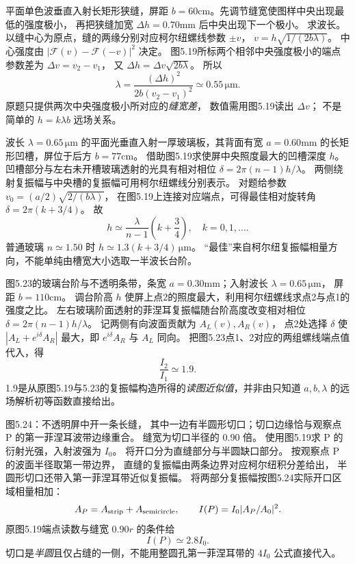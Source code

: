 平面单色波垂直入射长矩形狭缝，屏距
$b=60$cm。先调节缝宽使图样中央出现最低的强度极小，
再把狭缝加宽
$\Delta h=0.70$mm 后中央出现下一个极小。
求波长。
\exsolution
以缝中心为原点，缝的两缘分别对应柯尔纽螺线参数
$\pm v$，
$v=h\sqrt{1/(2b\lambda)}$。
中心强度由
$|\mathcal F(v)-\mathcal F(-v)|^2$ 决定。
图5.19所标两个相邻中央强度极小的端点参数差为
$\Delta v=v_2-v_1$，
又
$\Delta h=\Delta v\sqrt{2b\lambda}$。
所以
\[
\boxed{\lambda=
\frac{(\Delta h)^2}
{2b(v_2-v_1)^2}
\simeq0.55\,\mathrm{\mu m}}.
\]
\excheck 原题只提供两次中央强度极小所对应的\emph{缝宽差}，
数值需用图5.19读出 $\Delta v$；
不是简单的 $h=k\lambda b$ 远场关系。

波长 $\lambda=0.65\,\mathrm{\mu m}$ 的平面光垂直入射一厚玻璃板，其背面有宽
$a=0.60$mm 的长矩形凹槽，屏位于后方
$b=77$cm。
借助图5.19求使屏中央照度最大的凹槽深度 $h$。
\exsolution
凹槽部分与左右未开槽玻璃透射的光具有相对相位
$\delta=2\pi(n-1)h/\lambda$。
两侧绕射复振幅与中央槽的复振幅可用柯尔纽螺线分别表示。
对题给参数
$v_0=(a/2)\sqrt{2/(b\lambda)}$，
在图5.19上连接对应端点，可得最佳相对旋转角
$\delta=2\pi(k+3/4)$。
故
\[
\boxed{h\simeq
\frac{\lambda}{n-1}\left(k+\frac34\right)},
\quad k=0,1,\ldots.
\]
普通玻璃 $n\simeq1.50$ 时
$h\simeq1.3(k+3/4)\,\mathrm{\mu m}$。
\excheck “最佳”来自柯尔纽复振幅相量方向，不能单纯由槽宽大小选取一半波长台阶。

图5.23的玻璃台阶与不透明条带，条宽
$a=0.30$mm；入射波长
$\lambda=0.65\,\mathrm{\mu m}$，
屏距 $b=110$cm。
调台阶高 $h$ 使屏上点2的照度最大，利用柯尔纽螺线求点2与点1的强度之比。
\exsolution
左右玻璃阶面透射的菲涅耳复振幅随台阶高度改变相对相位
$\delta=2\pi(n-1)h/\lambda$。
记两侧有向波面贡献为
$A_L(v),A_R(v)$，
点2处选择 $\delta$ 使
$|A_L+e^{i\delta}A_R|$ 最大，即
$e^{i\delta}A_R$ 与 $A_L$ 同向。
把图5.23点1、2对应的两组螺线端点值代入，得
\[
\boxed{\frac{I_2}{I_1}\simeq1.9}.
\]
\excheck 1.9是从原图5.19与5.23的复振幅构造所得的\emph{读图近似值}，并非由只知道 $a,b,\lambda$ 的远场解析初等函数直接给出。

图5.24：不透明屏中开一条长缝，
其中一边有半圆形切口；切口边缘恰与观察点 P 的第一菲涅耳波带边缘重合。
缝宽为切口半径的 $0.90$ 倍。
使用图5.19求 P 的衍射光强，入射波强为 $I_0$。
\exsolution
将开口分为直缝部分与半圆缺口部分。
按观察点 P 的波面半径取第一带边界，
直缝的复振幅由两条边界对应柯尔纽积分差给出，
半圆形切口还带入第一菲涅耳带近似复振幅。
将两部分复振幅按图5.24实际开口区域相量相加：
\[
A_P=A_{\rm strip}+A_{\rm semicircle},
\qquad I(P)=I_0|A_P/A_0|^2 .
\]
原图5.19端点读数与缝宽 $0.90r$ 的条件给
\[
\boxed{I(P)\simeq2.8I_0}.
\]
\excheck 切口是\emph{半圆}且仅占缝的一侧，不能用整圆孔第一菲涅耳带的 $4I_0$ 公式直接代入。

